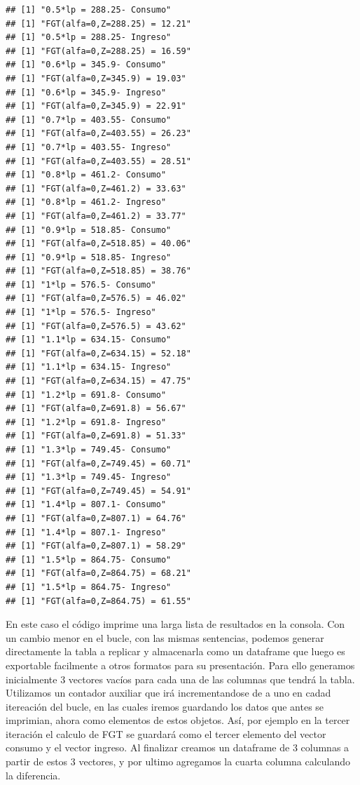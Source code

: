 \documentclass[
]{book}
\begin{document}
\begin{verbatim}
## [1] "0.5*lp = 288.25- Consumo"
## [1] "FGT(alfa=0,Z=288.25) = 12.21"
## [1] "0.5*lp = 288.25- Ingreso"
## [1] "FGT(alfa=0,Z=288.25) = 16.59"
## [1] "0.6*lp = 345.9- Consumo"
## [1] "FGT(alfa=0,Z=345.9) = 19.03"
## [1] "0.6*lp = 345.9- Ingreso"
## [1] "FGT(alfa=0,Z=345.9) = 22.91"
## [1] "0.7*lp = 403.55- Consumo"
## [1] "FGT(alfa=0,Z=403.55) = 26.23"
## [1] "0.7*lp = 403.55- Ingreso"
## [1] "FGT(alfa=0,Z=403.55) = 28.51"
## [1] "0.8*lp = 461.2- Consumo"
## [1] "FGT(alfa=0,Z=461.2) = 33.63"
## [1] "0.8*lp = 461.2- Ingreso"
## [1] "FGT(alfa=0,Z=461.2) = 33.77"
## [1] "0.9*lp = 518.85- Consumo"
## [1] "FGT(alfa=0,Z=518.85) = 40.06"
## [1] "0.9*lp = 518.85- Ingreso"
## [1] "FGT(alfa=0,Z=518.85) = 38.76"
## [1] "1*lp = 576.5- Consumo"
## [1] "FGT(alfa=0,Z=576.5) = 46.02"
## [1] "1*lp = 576.5- Ingreso"
## [1] "FGT(alfa=0,Z=576.5) = 43.62"
## [1] "1.1*lp = 634.15- Consumo"
## [1] "FGT(alfa=0,Z=634.15) = 52.18"
## [1] "1.1*lp = 634.15- Ingreso"
## [1] "FGT(alfa=0,Z=634.15) = 47.75"
## [1] "1.2*lp = 691.8- Consumo"
## [1] "FGT(alfa=0,Z=691.8) = 56.67"
## [1] "1.2*lp = 691.8- Ingreso"
## [1] "FGT(alfa=0,Z=691.8) = 51.33"
## [1] "1.3*lp = 749.45- Consumo"
## [1] "FGT(alfa=0,Z=749.45) = 60.71"
## [1] "1.3*lp = 749.45- Ingreso"
## [1] "FGT(alfa=0,Z=749.45) = 54.91"
## [1] "1.4*lp = 807.1- Consumo"
## [1] "FGT(alfa=0,Z=807.1) = 64.76"
## [1] "1.4*lp = 807.1- Ingreso"
## [1] "FGT(alfa=0,Z=807.1) = 58.29"
## [1] "1.5*lp = 864.75- Consumo"
## [1] "FGT(alfa=0,Z=864.75) = 68.21"
## [1] "1.5*lp = 864.75- Ingreso"
## [1] "FGT(alfa=0,Z=864.75) = 61.55"
\end{verbatim}

En este caso el código imprime una larga lista de resultados en la consola. Con un cambio menor en el bucle, con las mismas sentencias, podemos generar directamente la tabla a replicar y almacenarla como un dataframe que luego es exportable facilmente a otros formatos para su presentación. Para ello generamos inicialmente 3 vectores vacíos para cada una de las columnas que tendrá la tabla. Utilizamos un contador auxiliar que irá incrementandose de a uno en cadad itereación del bucle, en las cuales iremos guardando los datos que antes se imprimian, ahora como elementos de estos objetos. Así, por ejemplo en la tercer iteración el calculo de FGT se guardará como el tercer elemento del vector consumo y el vector ingreso. Al finalizar creamos un dataframe de 3 columnas a partir de estos 3 vectores, y por ultimo agregamos la cuarta columna calculando la diferencia.
\end{document}
